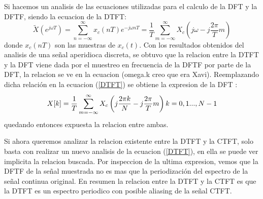 \documentclass[11pt,a4paper]{article}
\begin{document}
Si hacemos un analisis de las ecuaciones utilizadas para el calculo de la DFT y la DFTF, siendo la ecuacion de la DTFT: 
\begin{equation}
    \label{DTFT}
	\tilde{X}(e^{j \omega T}) = \sum_{n=- \infty}^{\infty} x_{c}(nT) e^{-j \omega nT}=\frac{1}{T}\sum_{m=- \infty}^{\infty} X_{c} \left(j \omega - j \frac{2 \pi}{T}	m \right)	
\end{equation}
 donde $x_{c}(nT)$ son las muestras de $x_{c}(t)$.
 Con los resultados obtenidos del analisis de una señal aperidioca discreta, se obtuvo que la relacion entre la DTFT y la DFT viene dada por el muestreo en frecuencia de la DFTF por parte de la DFT, la relacion
se ve en la ecuacion (omega.k creo que era Xavi). Reemplazando dicha relación en la ecuacion (\ref{DTFT}) se obtiene la expresion de la DFT :
 \begin{equation}
 X[k] = \frac{1}{T}\sum_{m=- \infty}^{\infty} X_{c} \left(j \frac{2 \pi k }{N} - j \frac{2 \pi}{T}	m \right)    k =0,1..., N-1 \\
 \end{equation}
 quedando entonces expuesta la relacion entre ambas.
 
 Si ahora queremos analizar la relacion existente entre la DTFT y la CTFT, solo basta con realizar un nuevo analisis de la ecuacion (\ref{DTFT}), en ella se puede ver implicita la relacion buscada.
 Por inspeccion de la ultima expresion, vemos que la DFTF de la señal muestrada no es mas que la periodización del espectro de la señal continua original.
 En resumen la relacion entre la DTFT y la CTFT es que la DTFT es un espectro periodico con posible aliasing de la señal CTFT.
 
\end{document}

